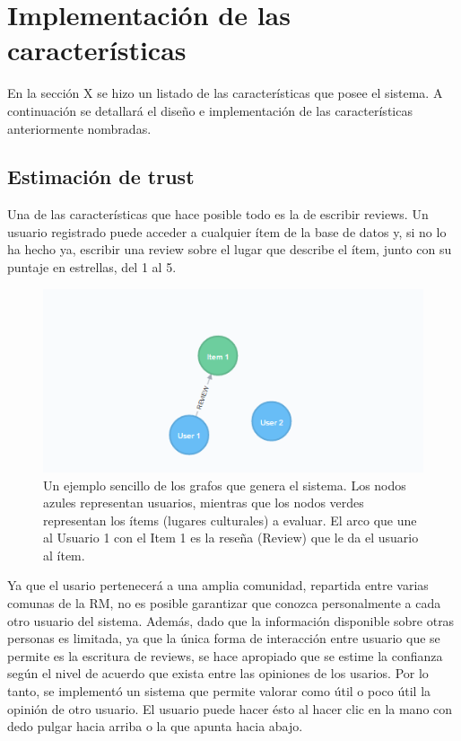 \section{Implementación de las características}

En la sección X se hizo un listado de las características que posee el sistema. A continuación se detallará el diseño e implementación de las características anteriormente nombradas.

\subsection{Estimación de trust} 

Una de las características que hace posible todo es la de escribir reviews. Un usuario registrado puede acceder a cualquier ítem de la base de datos y, si no lo ha hecho ya, escribir una review sobre el lugar que describe el ítem, junto con su puntaje en estrellas, del 1 al 5.

\begin{figure}[hbtp]
\centering
\includegraphics[scale=0.9]{images/grafoej1.png}
\caption{Un ejemplo sencillo de los grafos que genera el sistema. Los nodos azules representan usuarios, mientras que los nodos verdes representan los ítems (lugares culturales) a evaluar. El arco que une al Usuario 1 con el Item 1 es la reseña (Review) que le da el usuario al ítem.}
\end{figure}

Ya que el usario pertenecerá a una amplia comunidad, repartida entre varias comunas de la RM, no es posible garantizar que conozca personalmente a cada otro usuario del sistema. Además, dado que la información disponible sobre otras personas es limitada, ya que la única forma de interacción entre usuario que se permite es la escritura de reviews, se hace apropiado que se estime la confianza según el nivel de acuerdo que exista entre las opiniones de los usarios. Por lo tanto, se implementó un sistema que permite valorar como útil o poco útil la opinión de otro usuario. El usuario puede hacer ésto al hacer clic en la mano con dedo pulgar hacia arriba o la que apunta hacia abajo.

